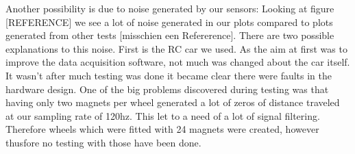 Another possibility is due to noise generated by our sensors:
Looking at figure [REFERENCE] we see a lot of noise generated in our plots compared to plots generated from other tests [misschien een Refererence]. There are two possible explanations to this noise. First is the RC car we used. As the aim at first was to improve the data acquisition software, not much was changed about the car itself. It wasn’t after much testing was done it became clear there were faults in the hardware design. One of the big problems discovered during testing was that having only two magnets per wheel generated a lot of zeros of distance traveled at our sampling rate of 120hz. This let to a need of a lot of signal filtering. Therefore wheels which were fitted with 24 magnets were created, however thusfore no testing with those have been done.

